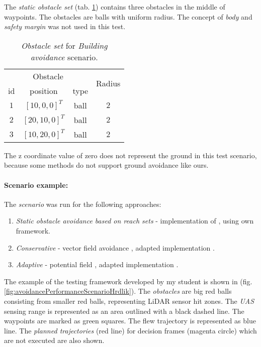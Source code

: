 \noindent The \emph{static obstacle set} (tab. \ref{tab:obstacleSetComparison}) contains three obstacles in the middle of waypoints. The obstacles are balls with uniform radius. The concept of \emph{body} and \emph{safety margin} was not used in this test.

\begin{table}[H]
	\centering
	\begin{tabular}{c|c|c|c}
		\multicolumn{3}{c|}{Obstacle} &  \multirow{2}{*}{Radius}\\\cline{1-3}
		id & position & type  &   \\\hline\hline
		$1$ & $[10,0,0]^T$ & ball  &$2$ \\\hline
		$2$ & $[20,10,0]^T$ & ball & $2$ \\\hline 
		$3$ & $[10,20,0]^T$ & ball  & $2$ 
	 \end{tabular}
	\caption{\emph{Obstacle set} for \emph{Building avoidance} scenario.}
	\label{tab:obstacleSetComparison}
\end{table}

\begin{note}
The z coordinate value of zero does not represent the ground in this test scenario, because some methods do not support ground avoidance like ours. 
\end{note}

\paragraph{Scenario example:} The \emph{scenario} was run for the following approaches:
\begin{enumerate}
    \item \emph{Static obstacle avoidance based on reach sets} - implementation \cite{hrdlik2018} of \cite{gomola2017obstacle}, using own framework.
    
    \item \emph{Conservative } - vector field avoidance \cite{borenstein1991vector}, adapted implementation \cite{hrdlik2018}.
    
    \item \emph{Adaptive} - potential field \cite{koren1991potential}, adapted implementation \cite{hrdlik2018}.
\end{enumerate}

\noindent The example of the testing framework developed by my student is shown in (fig. \ref{fig:avoidancePerformanceScenarioHrdlik}). The \emph{obstacles} are big red balls consisting from smaller red balls, representing LiDAR sensor hit zones. The \emph{UAS} sensing range is represented as an area outlined with a black dashed line. The waypoints are marked as green squares. The flew trajectory is represented as blue line. The \emph{planned trajectories} (red line) for decision frames (magenta circle) which are not executed are also shown.

